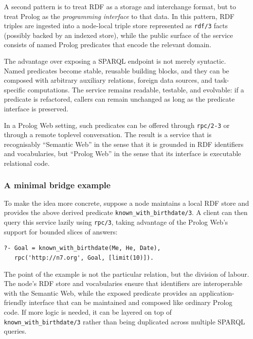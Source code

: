 A second pattern is to treat RDF as a storage and interchange format, but to treat Prolog as the \emph{programming interface} to that data. In this pattern, RDF triples are ingested into a node-local triple store represented as \texttt{rdf/3} facts (possibly backed by an indexed store), while the public surface of the service consists of named Prolog predicates that encode the relevant domain.

The advantage over exposing a SPARQL endpoint is not merely syntactic. Named predicates become stable, reusable building blocks, and they can be composed with arbitrary auxiliary relations, foreign data sources, and task-specific computations. The service remains readable, testable, and evolvable: if a predicate is refactored, callers can remain unchanged as long as the predicate interface is preserved.

In a Prolog Web setting, such predicates can be offered through \texttt{rpc/2-3} or through a remote toplevel conversation. The result is a service that is recognisably ``Semantic Web'' in the sense that it is grounded in RDF identifiers and vocabularies, but ``Prolog Web'' in the sense that its interface is executable relational code.

\subsubsection{A minimal bridge example}\label{sec:minimal-bridge-example}

To make the idea more concrete, suppose a node maintains a local RDF store and provides the above derived predicate \texttt{known\_with\_birthdate/3}. A client can then query this service lazily using \texttt{rpc/3}, taking advantage of the Prolog Web's support for bounded slices of answers:

\begin{verbatim}
?- Goal = known_with_birthdate(Me, He, Date),
   rpc('http://n7.org', Goal, [limit(10)]).
\end{verbatim}

\noindent The point of the example is not the particular relation, but the division of labour. The node's RDF store and vocabularies ensure that identifiers are interoperable with the Semantic Web, while the exposed predicate provides an application-friendly interface that can be maintained and composed like ordinary Prolog code. If more logic is needed, it can be layered on top of \texttt{known\_with\_birthdate/3} rather than being duplicated across multiple SPARQL queries.

